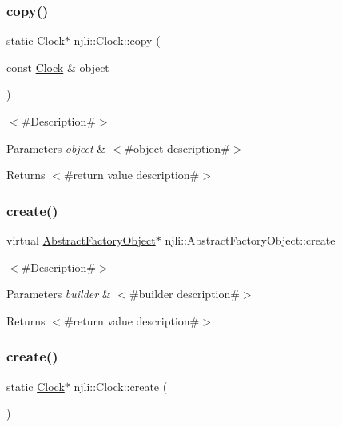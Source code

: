 \subsubsection{\texorpdfstring{copy()}{copy()}}
{\footnotesize\ttfamily static \mbox{\hyperlink{classnjli_1_1_clock}{Clock}}$\ast$ njli\+::\+Clock\+::copy (\begin{DoxyParamCaption}\item[{const \mbox{\hyperlink{classnjli_1_1_clock}{Clock}} \&}]{object }\end{DoxyParamCaption})\hspace{0.3cm}{\ttfamily [static]}}

$<$\#\+Description\#$>$


\begin{DoxyParams}{Parameters}
{\em object} & $<$\#object description\#$>$\\
\hline
\end{DoxyParams}
\begin{DoxyReturn}{Returns}
$<$\#return value description\#$>$ 
\end{DoxyReturn}
\mbox{\label{classnjli_1_1_clock_a83a8876ae63b92804004cf3febe76573}} 
\subsubsection{\texorpdfstring{create()}{create()}\hspace{0.1cm}{\footnotesize\ttfamily [1/3]}}
{\footnotesize\ttfamily virtual \mbox{\hyperlink{classnjli_1_1_abstract_factory_object}{Abstract\+Factory\+Object}}$\ast$ njli\+::\+Abstract\+Factory\+Object\+::create}

$<$\#\+Description\#$>$


\begin{DoxyParams}{Parameters}
{\em builder} & $<$\#builder description\#$>$\\
\hline
\end{DoxyParams}
\begin{DoxyReturn}{Returns}
$<$\#return value description\#$>$ 
\end{DoxyReturn}
\mbox{\label{classnjli_1_1_clock_a15b98bdfd4c744f0f3de68cacec783ab}} 
\subsubsection{\texorpdfstring{create()}{create()}\hspace{0.1cm}{\footnotesize\ttfamily [2/3]}}
{\footnotesize\ttfamily static \mbox{\hyperlink{classnjli_1_1_clock}{Clock}}$\ast$ njli\+::\+Clock\+::create (\begin{DoxyParamCaption}{ }\end{DoxyParamCaption})\hspace{0.3cm}{\ttfamily [static]}}

